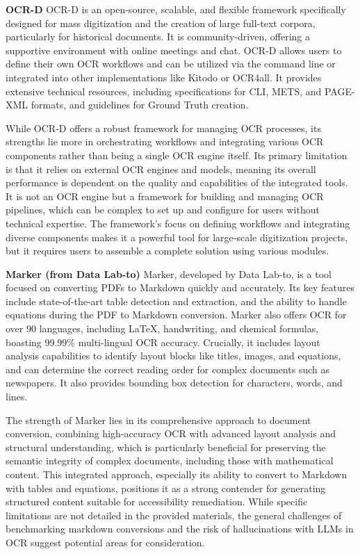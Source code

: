 \textbf{OCR-D}
OCR-D is an open-source, scalable, and flexible framework specifically designed for mass digitization and the creation of large full-text corpora, particularly for historical documents. It is community-driven, offering a supportive environment with online meetings and chat. OCR-D allows users to define their own OCR workflows and can be utilized via the command line or integrated into other implementations like Kitodo or OCR4all. It provides extensive technical resources, including specifications for CLI, METS, and PAGE-XML formats, and guidelines for Ground Truth creation.

While OCR-D offers a robust framework for managing OCR processes, its strengths lie more in orchestrating workflows and integrating various OCR components rather than being a single OCR engine itself. Its primary limitation is that it relies on external OCR engines and models, meaning its overall performance is dependent on the quality and capabilities of the integrated tools. It is not an OCR engine but a framework for building and managing OCR pipelines, which can be complex to set up and configure for users without technical expertise. The framework's focus on defining workflows and integrating diverse components makes it a powerful tool for large-scale digitization projects, but it requires users to assemble a complete solution using various modules.

\textbf{Marker (from Data Lab-to)}
Marker, developed by Data Lab-to, is a tool focused on converting PDFs to Markdown quickly and accurately. Its key features include state-of-the-art table detection and extraction, and the ability to handle equations during the PDF to Markdown conversion. Marker also offers OCR for over 90 languages, including LaTeX, handwriting, and chemical formulas, boasting 99.99\% multi-lingual OCR accuracy. Crucially, it includes layout analysis capabilities to identify layout blocks like titles, images, and equations, and can determine the correct reading order for complex documents such as newspapers. It also provides bounding box detection for characters, words, and lines.

The strength of Marker lies in its comprehensive approach to document conversion, combining high-accuracy OCR with advanced layout analysis and structural understanding, which is particularly beneficial for preserving the semantic integrity of complex documents, including those with mathematical content. This integrated approach, especially its ability to convert to Markdown with tables and equations, positions it as a strong contender for generating structured content suitable for accessibility remediation. While specific limitations are not detailed in the provided materials, the general challenges of benchmarking markdown conversions and the risk of hallucinations with LLMs in OCR suggest potential areas for consideration.

